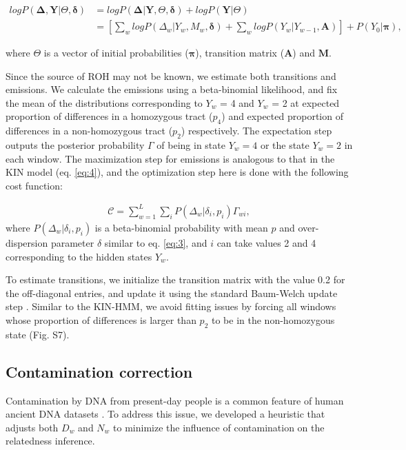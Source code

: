 \documentclass[12pt, letterpaper]{article}
\begin{document}
\begin{align}\label{eq:10}
    log P(\mathbf{\Delta},\mathbf{Y}|\Theta,\bm{\delta}) &= log P(\mathbf{\Delta}|\mathbf{Y},\Theta, \bm{\delta}) + log P(\mathbf{Y}|\Theta)\nonumber\\
 &= [\sum_{w} log P(\Delta_w|Y_w, M_w, \bm{\delta}) + \sum_{w} log P(Y_w|Y_{w-1}, \bm{A})] + P(Y_0| \bm{\pi}),
\end{align}

where $\Theta$ is a vector of initial probabilities ($\bm{\pi}$), transition matrix ($\bm{A}$) and $\bm{M}$.

Since the source of ROH may not be known, we estimate both transitions and emissions. We calculate the emissions using a beta-binomial likelihood, and fix the mean of the distributions corresponding to $Y_w$ = 4 and $Y_w$ = 2 at expected proportion of differences in a homozygous tract ($p_4$) and expected proportion of differences in a non-homozygous tract ($p_2$) respectively. The expectation step outputs the posterior probability $\Gamma$ of being in state $Y_w = 4$ or the state $Y_w = 2$ in each window. The maximization step for emissions is analogous to that in the KIN model (eq. \ref{eq:4}), and the optimization step here is done with the following cost function:

\begin{align}\label{eq:11}
\mathcal{C} = \sum_{w=1}^L \sum_{i} P(\Delta_w|\delta_{i},p_{i}) \Gamma_{wi} ,
\end{align}
where $P(\Delta_w|\delta_{i},p_{i})$ is a beta-binomial probability with mean $p$ and over-dispersion parameter $\delta$ similar to eq. \ref{eq:3}, and $i$ can take values 2 and 4 corresponding to the hidden states $Y_w$.

To estimate transitions, we initialize the transition matrix with the value 0.2 for the off-diagonal entries, and update it using the standard Baum-Welch update step \cite{baum_maximization_1970}. Similar to the KIN-HMM, we avoid fitting issues by forcing all windows whose proportion of differences is larger than $p_2$ to be in the non-homozygous state (Fig. S7).

\subsection{Contamination correction}\label{contam}
Contamination by DNA from present-day people is a common feature of human ancient DNA datasets \cite{peyregne_present-day_2020}. To address this issue, we developed a heuristic that adjusts both $D_w$ and $N_w$ to minimize the influence of contamination on the relatedness inference.
\end{document}
